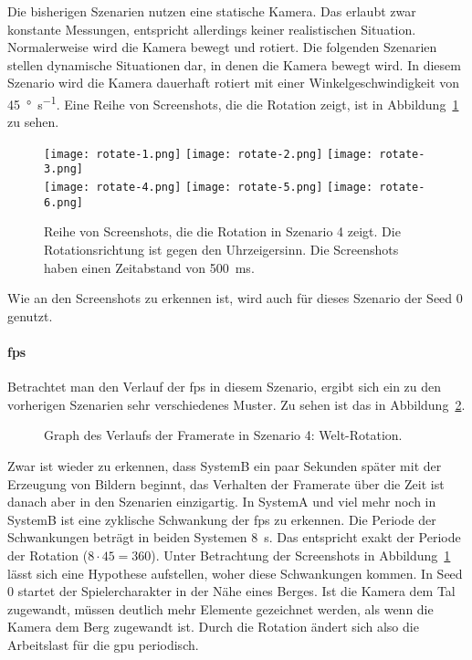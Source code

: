 Die bisherigen Szenarien nutzen eine statische Kamera. Das erlaubt zwar konstante Messungen, entspricht allerdings keiner realistischen Situation. Normalerweise wird die Kamera bewegt und rotiert. Die folgenden Szenarien stellen dynamische Situationen dar, in denen die Kamera bewegt wird. In diesem Szenario wird die Kamera dauerhaft rotiert mit einer Winkelgeschwindigkeit von \SI{45}{\degree\per\second}. Eine Reihe von Screenshots, die die Rotation zeigt, ist in Abbildung~\ref{fig:rotate} zu sehen.
\begin{figure}
	\centering
	\texttt{[image: rotate-1.png]}
	\texttt{[image: rotate-2.png]}
	\texttt{[image: rotate-3.png]}\\[4pt]
	\texttt{[image: rotate-4.png]}
	\texttt{[image: rotate-5.png]}
	\texttt{[image: rotate-6.png]}
	\caption{Reihe von Screenshots, die die Rotation in Szenario 4 zeigt. Die Rotationsrichtung ist gegen den Uhrzeigersinn. Die Screenshots haben einen Zeitabstand von \SI{500}{\milli\second}.}\label{fig:rotate}
\end{figure}
Wie an den Screenshots zu erkennen ist, wird auch für dieses Szenario der Seed 0 genutzt.

\paragraph{\ac{fps}}
Betrachtet man den Verlauf der \ac{fps} in diesem Szenario, ergibt sich ein zu den vorherigen Szenarien sehr verschiedenes Muster. Zu sehen ist das in Abbildung~\ref{fig:seed-0-rotate-fps}.
\begin{figure}[!htbp]
	\caption{Graph des Verlaufs der Framerate in Szenario 4: Welt-Rotation.}\label{fig:seed-0-rotate-fps}
\end{figure}
 Zwar ist wieder zu erkennen, dass SystemB ein paar Sekunden später mit der Erzeugung von Bildern beginnt, das Verhalten der Framerate über die Zeit ist danach aber in den Szenarien einzigartig. In SystemA und viel mehr noch in SystemB ist eine zyklische Schwankung der \ac{fps} zu erkennen. Die Periode der Schwankungen beträgt in beiden Systemen \SI{8}{\second}. Das entspricht exakt der Periode der Rotation ($8\cdot45 = 360$). Unter Betrachtung der Screenshots in Abbildung~\ref{fig:rotate} lässt sich eine Hypothese aufstellen, woher diese Schwankungen kommen. In Seed 0 startet der Spielercharakter in der Nähe eines Berges. Ist die Kamera dem Tal zugewandt, müssen deutlich mehr Elemente gezeichnet werden, als wenn die Kamera dem Berg zugewandt ist. Durch die Rotation ändert sich also die Arbeitslast für die \ac{gpu} periodisch.

